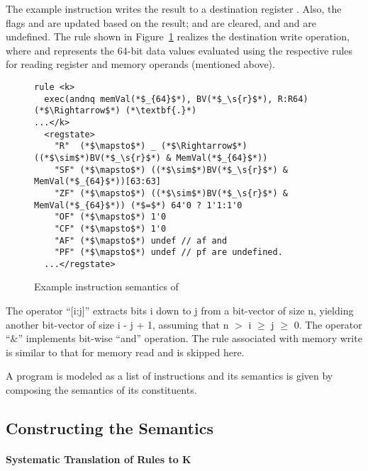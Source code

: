 The example instruction writes the result to a destination register . Also, the flags  and  are updated based on the result;  and   are cleared, and  and  are undefined. The rule shown in Figure~\ref{fig:andn-semantics} realizes the destination write operation, where  and  represents the $64$-bit data values evaluated using the respective rules for reading register and memory operands (mentioned above).
%
%
\begin{figure}
\begin{lstlisting}[style=KRULE]
rule <k>
  exec(andnq memVal(*$_{64}$*), BV(*$_\s{r}$*), R:R64) (*$\Rightarrow$*) (*\textbf{.}*)
...</k>
  <regstate>
    "R"  (*$\mapsto$*) _ (*$\Rightarrow$*) ((*$\sim$*)BV(*$_\s{r}$*) & MemVal(*$_{64}$*))
    "SF" (*$\mapsto$*) ((*$\sim$*)BV(*$_\s{r}$*) & MemVal(*$_{64}$*))[63:63]
    "ZF" (*$\mapsto$*) ((*$\sim$*)BV(*$_\s{r}$*) & MemVal(*$_{64}$*)) (*$=$*) 64'0 ? 1'1:1'0
    "OF" (*$\mapsto$*) 1'0
    "CF" (*$\mapsto$*) 1'0
    "AF" (*$\mapsto$*) undef // af and
    "PF" (*$\mapsto$*) undef // pf are undefined.
  ...</regstate>  
\end{lstlisting}
\vspace{-5pt}
\caption{Example instruction semantics of }
\label{fig:andn-semantics}
\end{figure}
The operator ``[i:j]'' extracts bits i down to j from a bit-vector of size n, yielding another  bit-vector of size i - j + 1, assuming that n $>$ i $\ge$ j $\ge$ 0. The operator ``$\&$'' implements bit-wise ``and'' operation. The rule associated with memory write is similar to that for memory read and is skipped here. 

A \ISA program is modeled as a list of instructions and its semantics is  given by composing the semantics of its constituents.

\subsection{Constructing the \ISA Semantics}
\label{sec:Approach}

%

\paragraph{Systematic Translation of \Strata Rules to K}

